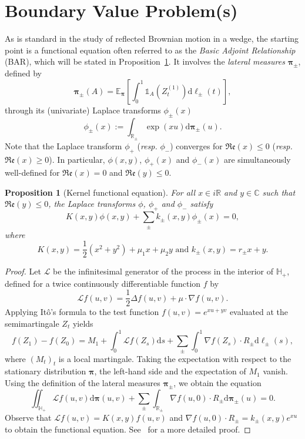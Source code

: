 \documentclass{article}
\theoremstyle{plain}
\newtheorem{proposition}[theorem]{Proposition}
\theoremstyle{definition}
\theoremstyle{remark}
\begin{document}
\section{Boundary Value Problem(s)}\label{sec:bvp}
As is standard in the study of reflected Brownian motion in a wedge, the starting point is a functional equation often referred to as the \textit{Basic Adjoint Relationship} (BAR), which will be stated in Proposition~\ref{prop:FE}. It involves the \textit{lateral measures} $\boldsymbol{\pi}_\pm$, defined by
$$\boldsymbol{\pi}_\pm(A)=\mathbb{E}_{\boldsymbol{\pi}}\left[\int_0^1 \mathds1_A\left(Z_t^{(1)}\right)\mathrm{d}\ell_\pm(t)\right],$$
through its (univariate) Laplace transforms $\phi_\pm(x)$
$$\phi_\pm(x):=\int_{\mathbb R_\pm}\exp(xu)\mathrm{d}\boldsymbol{\pi}_\pm(u).$$
Note that the Laplace transform $\phi_+$ (\textit{resp.} $\phi_-$) converges for $\mathfrak{Re}(x)\leqslant 0$ (\textit{resp.} $\mathfrak{Re}(x)\geqslant 0$). In particular, $\phi(x,y)$, $\phi_+(x)$ and $\phi_-(x)$ are simultaneously well-defined for $\mathfrak{Re}(x)=0$ and $\mathfrak{Re}(y)\leqslant 0$.
\begin{proposition}[Kernel functional equation]\label{prop:FE} For all $x\in i\mathbb R$ and $y\in\mathbb C$ such that $\mathfrak{Re}(y)\leqslant 0$, the Laplace transforms $\phi$, $\phi_+$ and $\phi_-$ satisfy
\begin{equation}\label{eq:FE}
    K(x,y)\phi(x,y)+\sum_\pm k_\pm(x,y)\phi_\pm(x)=0,
\end{equation}
where 
$$K(x,y)=\frac{1}{2}\left(x^2+y^2\right)+\mu_1 x +\mu_2 y\text{ and }k_\pm(x,y)=r_\pm x+y.$$
\end{proposition}

\begin{proof}
Let $\mathcal{L}$ be the infinitesimal generator of the process in the interior of $\mathbb H_+$, defined for a twice continuously differentiable function $f$ by
$$ \mathcal{L}f(u,v)=\frac{1}{2}\Delta f(u,v) + \mu \cdot \nabla f(u,v).$$
Applying Itô's formula to the test function $f(u,v)=e^{xu+yv}$ evaluated at the semimartingale $Z_t$ yields
$$ f(Z_1) - f(Z_0) = M_1 + \int_0^1 \mathcal{L}f(Z_s) \mathrm{d}s + \sum_{\pm} \int_0^1 \nabla f(Z_s) \cdot R_{\pm} \mathrm{d}\ell_{\pm}(s), $$
where $(M_t)_t$ is a local martingale. Taking the expectation with respect to the stationary distribution $\boldsymbol{\pi}$, the left-hand side and the expectation of $M_1$ vanish. Using the definition of the lateral measures $\boldsymbol{\pi}_{\pm}$, we obtain the equation
$$ \iint_{\mathbb{H}_+} \mathcal{L}f(u,v) \mathrm{d}\boldsymbol{\pi}(u,v) + \sum_{\pm} \int_{\mathbb{R}_{\pm}} \nabla f(u,0) \cdot R_{\pm} \mathrm{d}\boldsymbol{\pi}_{\pm}(u)=0.$$
Observe that $\mathcal{L}f(u,v) = K(x,y)f(u,v)$ and $\nabla f(u,0) \cdot R_{\pm} = k_{\pm}(x,y) e^{xu}$ to obtain the functional equation. See~\cite{Harrison_Williams_1987} for a more detailed proof. 
\end{proof}
\end{document}
